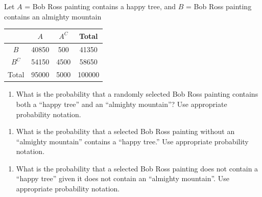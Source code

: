\documentclass[
]{report}
\providecommand{\tightlist}{%
  \setlength{\itemsep}{0pt}\setlength{\parskip}{0pt}}
\begin{document}
Let \(A\) = Bob Ross painting contains a happy tree, and \(B\) = Bob Ross painting contains an almighty mountain
\vspace{0.1in}

\begin{center}
\begin{tabular}{|c|c|c|c|} \hline
\hspace{0.8in} & \hspace{0.25in}  $A$ \hspace{.25in} & \hspace{0.25in} $A^C$ \hspace{0.25in} & \hspace{0.25in} Total \hspace{0.25in} \\ \hline
 $B$ & 40850 & 500 & 41350 \\ \hline
 $B^C$ & 54150 & 4500 & 58650 \\ \hline
Total & 95000 & 5000 & 100000 \\ \hline
\end{tabular}
\end{center}
\vspace{.1in}

\begin{enumerate}
\def\labelenumi{\alph{enumi}.}
\tightlist
\item
  What is the probability that a randomly selected Bob Ross painting contains both a ``happy tree'' and an ``almighty mountain''? Use appropriate probability notation.
\end{enumerate}

\vspace{0.5in}

\begin{enumerate}
\def\labelenumi{\alph{enumi}.}
\setcounter{enumi}{1}
\tightlist
\item
  What is the probability that a selected Bob Ross painting without an ``almighty mountain'' contains a ``happy tree.'' Use appropriate probability notation.
\end{enumerate}

\vspace{0.5in}

\begin{enumerate}
\def\labelenumi{\alph{enumi}.}
\setcounter{enumi}{2}
\tightlist
\item
  What is the probability that a selected Bob Ross painting does not contain a ``happy tree'' given it does not contain an ``almighty mountain''. Use appropriate probability notation.
\end{enumerate}
\end{document}

